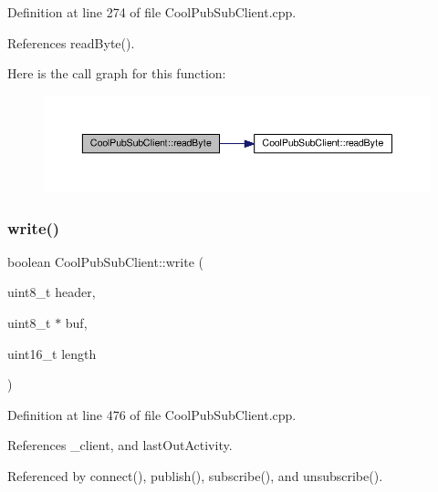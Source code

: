 Definition at line 274 of file Cool\+Pub\+Sub\+Client.\+cpp.



References read\+Byte().

Here is the call graph for this function\+:\nopagebreak
\begin{figure}[H]
\begin{center}
\leavevmode
\includegraphics[width=350pt]{d8/d4b/class_cool_pub_sub_client_abef3735bb9a2a8c87b3da659dc4ade03_cgraph}
\end{center}
\end{figure}
\mbox{\label{class_cool_pub_sub_client_a7a8e4854a1846eaa668046d3854d47ad}} 
\subsubsection{\texorpdfstring{write()}{write()}}
{\footnotesize\ttfamily boolean Cool\+Pub\+Sub\+Client\+::write (\begin{DoxyParamCaption}\item[{uint8\+\_\+t}]{header,  }\item[{uint8\+\_\+t $\ast$}]{buf,  }\item[{uint16\+\_\+t}]{length }\end{DoxyParamCaption})\hspace{0.3cm}{\ttfamily [private]}}



Definition at line 476 of file Cool\+Pub\+Sub\+Client.\+cpp.



References \+\_\+client, and last\+Out\+Activity.



Referenced by connect(), publish(), subscribe(), and unsubscribe().

